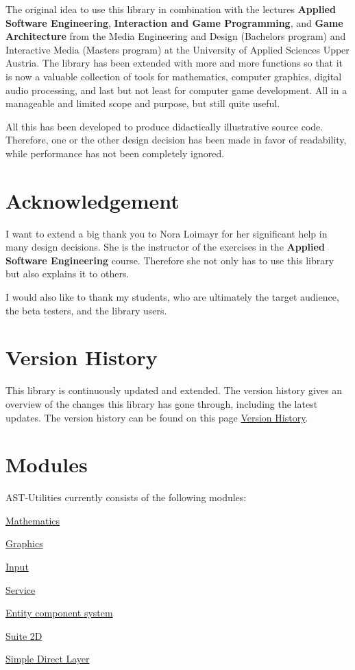 The original idea to use this library in combination with the lectures {\bfseries Applied Software Engineering}, {\bfseries Interaction and Game Programming}, and {\bfseries Game Architecture} from the Media Engineering and Design (Bachelor\textquotesingle{}s program) and Interactive Media (Master\textquotesingle{}s program) at the University of Applied Sciences Upper Austria. The library has been extended with more and more functions so that it is now a valuable collection of tools for mathematics, computer graphics, digital audio processing, and last but not least for computer game development. All in a manageable and limited scope and purpose, but still quite useful.

All this has been developed to produce didactically illustrative source code. Therefore, one or the other design decision has been made in favor of readability, while performance has not been completely ignored.\hypertarget{index_ack_section}{}\section{Acknowledgement}\label{index_ack_section}
I want to extend a big thank you to Nora Loimayr for her significant help in many design decisions. She is the instructor of the exercises in the {\bfseries Applied Software Engineering} course. Therefore she not only has to use this library but also explains it to others.

I would also like to thank my students, who are ultimately the target audience, the beta testers, and the library users.\hypertarget{index_hist_sect}{}\section{Version History}\label{index_hist_sect}
This library is continuously updated and extended. The version history gives an overview of the changes this library has gone through, including the latest updates. The version history can be found on this page \hyperlink{CHANGES}{Version History}.\hypertarget{index_io_sect}{}\section{Modules}\label{index_io_sect}
A\+S\+T-\/\+Utilities currently consists of the following modules\+:


\begin{DoxyItemize}
\item \hyperlink{group__math__group}{Mathematics}
\item \hyperlink{group__gfx__group}{Graphics}
\item \hyperlink{group__input__group}{Input}
\item \hyperlink{group__srv__group}{Service}
\item \hyperlink{group__ecs__group}{Entity component system}
\item \hyperlink{group__suite2d__group}{Suite 2D}
\item \hyperlink{group__sdl__group}{Simple Direct Layer} 
\end{DoxyItemize}